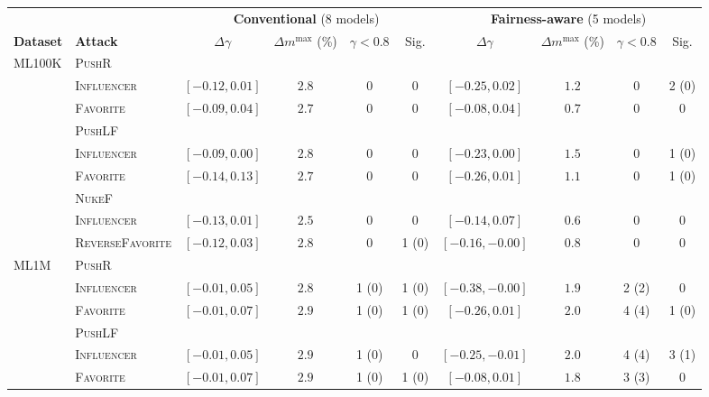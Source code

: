 \begin{table}
\begin{adjustbox}{max width=\textwidth}
\centering
\begin{tabular}{l l cccc cccc}
\toprule
 & & \multicolumn{4}{c}{\textbf{Conventional} (8 models)} & \multicolumn{4}{c}{\textbf{Fairness-aware} (5 models)} \\
\cmidrule(lr){3-6}\cmidrule(lr){7-10}
\textbf{Dataset} & \textbf{Attack} & $\Delta\gamma$ & $\Delta m^{\max}$ (\%) & $\gamma<0.8$ & Sig. & $\Delta\gamma$ & $\Delta m^{\max}$ (\%) & $\gamma<0.8$ & Sig. \\
\midrule
\multirow{9}{*}{ML100K} & \multicolumn{9}{l}{\textsc{PushR}} \\
 & \quad \textsc{Influencer} & $[-0.12, 0.01]$ & $2.8$ & 0 & 0 & $[-0.25, 0.02]$ & $1.2$ & 0 & 2 (0) \\
 & \quad \textsc{Favorite} & $[-0.09, 0.04]$ & $2.7$ & 0 & 0 & $[-0.08, 0.04]$ & $0.7$ & 0 & 0 \\
\addlinespace[2pt]
 & \multicolumn{9}{l}{\textsc{PushLF}} \\
 & \quad \textsc{Influencer} & $[-0.09, 0.00]$ & $2.8$ & 0 & 0 & $[-0.23, 0.00]$ & $1.5$ & 0 & 1 (0) \\
 & \quad \textsc{Favorite} & $[-0.14, 0.13]$ & $2.7$ & 0 & 0 & $[-0.26, 0.01]$ & $1.1$ & 0 & 1 (0) \\
\cmidrule(lr){2-10}
 & \multicolumn{9}{l}{\textsc{NukeF}} \\
 & \quad \textsc{Influencer} & $[-0.13, 0.01]$ & $2.5$ & 0 & 0 & $[-0.14, 0.07]$ & $0.6$ & 0 & 0 \\
 & \quad \textsc{ReverseFavorite} & $[-0.12, 0.03]$ & $2.8$ & 0 & 1 (0) & $[-0.16, -0.00]$ & $0.8$ & 0 & 0 \\
\cmidrule(lr){1-10}
\multirow{9}{*}{ML1M} & \multicolumn{9}{l}{\textsc{PushR}} \\
 & \quad \textsc{Influencer} & $[-0.01, 0.05]$ & $2.8$ & 1 (0) & 1 (0) & $[-0.38, -0.00]$ & $1.9$ & 2 (2) & 0 \\
 & \quad \textsc{Favorite} & $[-0.01, 0.07]$ & $2.9$ & 1 (0) & 1 (0) & $[-0.26, 0.01]$ & $2.0$ & 4 (4) & 1 (0) \\
\addlinespace[2pt]
 & \multicolumn{9}{l}{\textsc{PushLF}} \\
 & \quad \textsc{Influencer} & $[-0.01, 0.05]$ & $2.9$ & 1 (0) & 0 & $[-0.25, -0.01]$ & $2.0$ & 4 (4) & 3 (1) \\
 & \quad \textsc{Favorite} & $[-0.01, 0.07]$ & $2.9$ & 1 (0) & 1 (0) & $[-0.08, 0.01]$ & $1.8$ & 3 (3) & 0 \\

\end{tabular}
\end{adjustbox}
\end{table}
